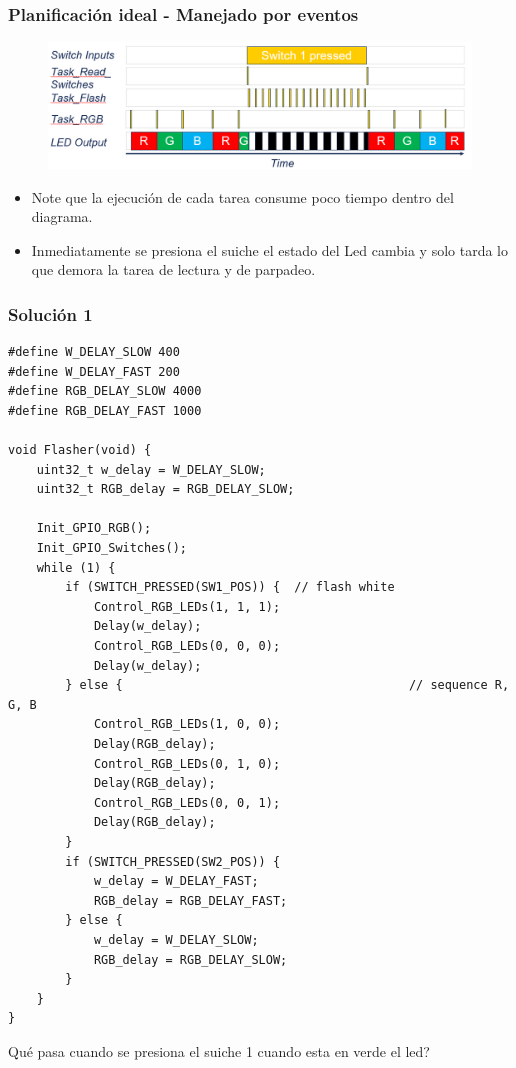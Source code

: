 \documentclass[10.5pt,scale=1.0,t,aspectratio=169,hyperref={pdfpagelabels=false}]{beamer}
\begin{document}
\begin{frame}
	\frametitle{Planificación ideal - Manejado por eventos}
	\begin{figure}
		\centering
		\includegraphics[scale=0.5]{03_IdealSchedulling}
	\end{figure}

\begin{itemize}
	\item Note que la ejecución de cada tarea consume poco tiempo dentro del diagrama.
	\item Inmediatamente se presiona el suiche el estado del Led cambia y solo tarda lo que demora la tarea de lectura y de parpadeo. 
\end{itemize}
\end{frame}
\begin{frame}[fragile]
	\frametitle{Solución 1}
	\begin{multicols}{2}
\begin{lstlisting}[style=CStyle]
#define W_DELAY_SLOW 400
#define W_DELAY_FAST 200
#define RGB_DELAY_SLOW 4000
#define RGB_DELAY_FAST 1000

void Flasher(void) {
	uint32_t w_delay = W_DELAY_SLOW;
	uint32_t RGB_delay = RGB_DELAY_SLOW;
	
	Init_GPIO_RGB();
	Init_GPIO_Switches();
	while (1) {
		if (SWITCH_PRESSED(SW1_POS)) {	// flash white
			Control_RGB_LEDs(1, 1, 1);
			Delay(w_delay);
			Control_RGB_LEDs(0, 0, 0);
			Delay(w_delay);
		} else {										// sequence R, G, B
			Control_RGB_LEDs(1, 0, 0);
			Delay(RGB_delay);
			Control_RGB_LEDs(0, 1, 0);
			Delay(RGB_delay);
			Control_RGB_LEDs(0, 0, 1);
			Delay(RGB_delay);
		}
		if (SWITCH_PRESSED(SW2_POS)) {
			w_delay = W_DELAY_FAST;
			RGB_delay = RGB_DELAY_FAST;
		} else {
			w_delay = W_DELAY_SLOW;
			RGB_delay = RGB_DELAY_SLOW;
		}
	}
}
\end{lstlisting}
	\end{multicols}
Qué pasa cuando se presiona el suiche 1 cuando esta en verde el led?
\end{frame}
\end{document}
